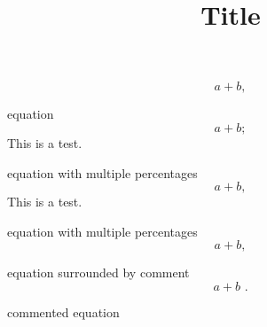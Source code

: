 \documentclass[12pt]{article}
\title{Title}
\author{}
\date{}
\begin{document}


\begin{equation}
  a+b
  ,
\end{equation}


equation
\begin{equation}
  a+b    ;
\end{equation}
This is a test.


equation with multiple percentages
%
%
\begin{equation}
  a+b,
\end{equation}
%
This is a test.

equation with multiple percentages
%
%
\begin{equation}
  a+b  ,
\end{equation}
%
%


equation surrounded by comment
%
\begin{equation}
  a+b 
  \,\, .
\end{equation}
%


commented equation
\end{document}
